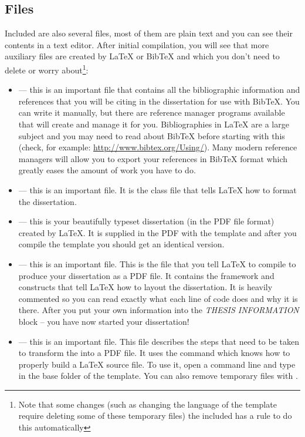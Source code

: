 \subsection{Files}

Included are also several files, most of them are plain text and you can see their contents in a text editor. After initial compilation, you will see that more auxiliary files are created by \LaTeX{} or BibTeX and which you don't need to delete or worry about\footnote{Note that some changes (such as changing the language of the template require deleting some of these temporary files) the included  has a  rule to do this automatically}:

\begin{itemize}
	\item {} --- this is an important file that contains all the bibliographic information and references that you will be citing in the dissertation for use with BibTeX. You can write it manually, but there are reference manager programs available that will create and manage it for you. Bibliographies in \LaTeX{} are a large subject and you may need to read about BibTeX before starting with this (check, for example: \url{http://www.bibtex.org/Using/}). Many modern reference managers will allow you to export your references in BibTeX format which greatly eases the amount of work you have to do.

	\item {} --- this is an important file. It is the class file that tells \LaTeX{} how to format the dissertation. 

	\item {} --- this is your beautifully typeset dissertation (in the PDF file format) created by \LaTeX{}. It is supplied in the PDF with the template and after you compile the template you should get an identical version.

	\item {} --- this is an important file. This is the file that you tell \LaTeX{} to compile to produce your dissertation as a PDF file. It contains the framework and constructs that tell \LaTeX{} how to layout the dissertation. It is heavily commented so you can read exactly what each line of code does and why it is there. After you put your own information into the \emph{THESIS INFORMATION} block -- you have now started your dissertation!

	\item {} --- this is an important file. This file describes the steps that need to be taken to transform the  into a PDF file. It uses the command  which knows how to properly build a \LaTeX{} source file. To use it, open a command line and type  in the base folder of the template. You can also remove temporary files with . 


\end{itemize}
